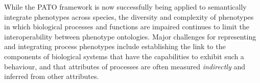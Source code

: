 \documentclass{bioinfo}
\begin{document}
While the PATO framework is now successfully being applied to
semantically integrate phenotypes across species, the diversity and
complexity of phenotypes in which biological processes and functions
are impaired continues to limit the interoperability between phenotype
ontologies. Major challenges for representing and integrating process
phenotypes include establishing the link to the components of
biological systems that have the capabilities to exhibit such a
behaviour, and that attributes of processes are often measured {\em
  indirectly} and inferred from other attributes.


\end{document}

